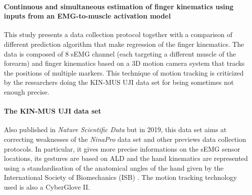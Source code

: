 \documentclass{article}
\begin{document}
	
	
	\paragraph{Continuous and simultaneous estimation of finger kinematics using inputs from an EMG-to-muscle activation model \cite{ref:Ngeo2014}}
	
	This study presents a data collection protocol together with a comparison of different prediction algorithm that make regression of the finger kinematics. The data is composed of 8 sEMG channel (each targeting a different muscle of the forearm) and finger kinematics based on a 3D motion camera system that tracks the positions of multiple markers. This technique of motion tracking is criticized by the researchers doing the KIN-MUS UJI data set for being sometimes not enough precise. 
	
	\paragraph{The KIN-MUS UJI data set \cite{ref:KinMusUji}}
	
	Also published in \textit{Nature Scientific Data} but in 2019, this data set aims at correcting weaknesses of the \textit{NinaPro} data set and other previews data collection protocols. In particular, it gives more precise informations on the sEMG sensor locations, its gestures are based on ALD and the hand kinematics are represented using a standardisation of the anatomical angles of the hand given by the International Society of Biomechanics (ISB) \cite{ref:handAnatomicalAngles}. The motion tracking technology used is also a CyberGlove II.
	
	
\end{document}
